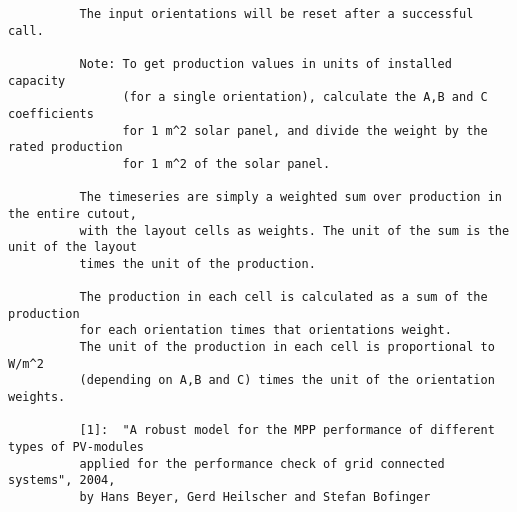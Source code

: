 \begin{verbatim}
          The input orientations will be reset after a successful call.

          Note: To get production values in units of installed capacity
                (for a single orientation), calculate the A,B and C coefficients
                for 1 m^2 solar panel, and divide the weight by the rated production
                for 1 m^2 of the solar panel.

          The timeseries are simply a weighted sum over production in the entire cutout,
          with the layout cells as weights. The unit of the sum is the unit of the layout
          times the unit of the production.

          The production in each cell is calculated as a sum of the production
          for each orientation times that orientations weight.
          The unit of the production in each cell is proportional to W/m^2
          (depending on A,B and C) times the unit of the orientation weights.

          [1]:  "A robust model for the MPP performance of different types of PV-modules
          applied for the performance check of grid connected systems", 2004,
          by Hans Beyer, Gerd Heilscher and Stefan Bofinger
          
\end{verbatim}

